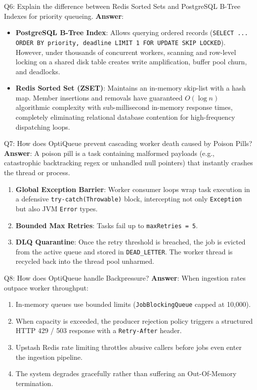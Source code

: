 \documentclass[11pt,a4paper]{article}
\begin{document}
\begin{interviewbox}{Q6: Explain the difference between Redis Sorted Sets and PostgreSQL B-Tree Indexes for priority queueing.}
\textbf{Answer}:
\begin{itemize}
    \item \textbf{PostgreSQL B-Tree Index}: Allows querying ordered records (\texttt{SELECT ... ORDER BY priority, deadline LIMIT 1 FOR UPDATE SKIP LOCKED}). However, under thousands of concurrent workers, scanning and row-level locking on a shared disk table creates write amplification, buffer pool churn, and deadlocks.
    \item \textbf{Redis Sorted Set (ZSET)}: Maintains an in-memory skip-list with a hash map. Member insertions and removals have guaranteed $O(\log n)$ algorithmic complexity with sub-millisecond in-memory response times, completely eliminating relational database contention for high-frequency dispatching loops.
\end{itemize}
\end{interviewbox}

\begin{interviewbox}{Q7: How does OptiQueue prevent cascading worker death caused by Poison Pills?}
\textbf{Answer}:
A poison pill is a task containing malformed payloads (e.g., catastrophic backtracking regex or unhandled null pointers) that instantly crashes the thread or process.
\begin{enumerate}
    \item \textbf{Global Exception Barrier}: Worker consumer loops wrap task execution in a defensive \texttt{try-catch(Throwable)} block, intercepting not only \texttt{Exception} but also JVM \texttt{Error} types.
    \item \textbf{Bounded Max Retries}: Tasks fail up to \texttt{maxRetries = 5}.
    \item \textbf{DLQ Quarantine}: Once the retry threshold is breached, the job is evicted from the active queue and stored in \texttt{DEAD\_LETTER}. The worker thread is recycled back into the thread pool unharmed.
\end{enumerate}
\end{interviewbox}

\begin{interviewbox}{Q8: How does OptiQueue handle Backpressure?}
\textbf{Answer}:
When ingestion rates outpace worker throughput:
\begin{enumerate}
    \item In-memory queues use bounded limits (\texttt{JobBlockingQueue} capped at 10,000).
    \item When capacity is exceeded, the producer rejection policy triggers a structured HTTP 429 / 503 response with a \texttt{Retry-After} header.
    \item Upstash Redis rate limiting throttles abusive callers before jobs even enter the ingestion pipeline.
    \item The system degrades gracefully rather than suffering an Out-Of-Memory termination.
\end{enumerate}
\end{interviewbox}
\end{document}

